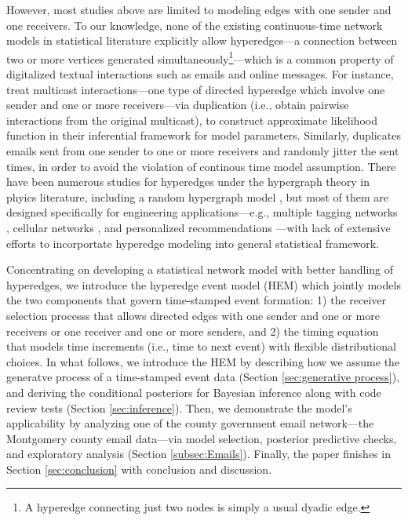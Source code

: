\documentclass[ba]{imsart}
\numberwithin{equation}{section}
\theoremstyle{plain}
\begin{document}
However, most studies above are limited to modeling edges with one sender and one receivers. To our knowledge, none of the existing continuous-time network models in statistical literature explicitly allow hyperedges---a connection between two or more vertices generated simultaneously\footnote{A hyperedge connecting just two nodes is simply a usual dyadic edge.}---which is a common property of digitalized textual interactions such as emails and online messages. For instance, \cite{PerryWolfe2012} treat multicast interactions---one type of directed hyperedge which involve one sender and one or more receivers---via duplication (i.e., obtain pairwise interactions from the original multicast), to construct approximate likelihood function in their inferential framework for model parameters. Similarly, \cite{fan2009learning} duplicates emails sent from one sender to one or more receivers and randomly jitter the sent times, in order to avoid the violation of continous time model assumption. There have been numerous studies for hyperedges under the hypergraph theory \citep{karypis1999multilevel} in phyics literature, including a random hypergraph model \citep{ghoshal2009random}, but most of them are designed specifically for engineering applications---e.g., multiple tagging networks \citep{zlatic2009hypergraph,zhang2010hypergraph}, cellular networks \citep{klamt2009hypergraphs}, and personalized recommendations \citep{zhang2010personalized,blattner2009b}---with lack of extensive efforts to incorportate hyperedge modeling into general statistical framework.

Concentrating on developing a statistical network model with better handling of hyperedges, we introduce the hyperedge event model (HEM) which jointly models the two components that govern time-stamped event formation: 1) the receiver selection processs that allows directed edges with one sender and one or more receivers or one receiver and one or more senders, and 2) the timing equation that models time increments (i.e., time to next event) with flexible distributional choices. In what follows, we introduce the HEM by describing how we assume the generatve process of a time-stamped event data (Section \ref{sec:generative process}), and deriving the conditional posteriors for Bayesian inference along with code review tests (Section \ref{sec:inference}). Then, we demonstrate the model's applicability by analyzing one of the county government email network---the Montgomery county email data---via model selection, posterior predictive checks, and exploratory analysis (Section \ref{subsec:Emails}). Finally, the paper finishes in Section \ref{sec:conclusion} with conclusion and discussion.
\end{document}
